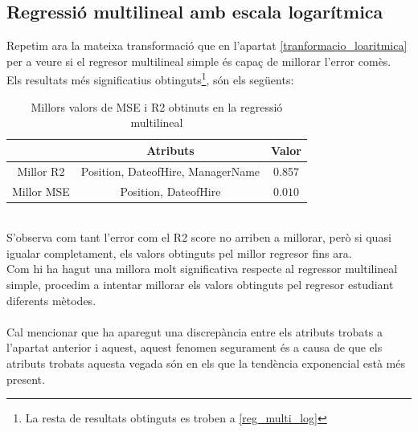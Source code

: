 \documentclass[a4paper, 11pt]{article}
\begin{document}
\subsection{Regressió multilineal amb escala logarítmica}
Repetim ara la mateixa transformació que en l'apartat \textcolor{blue}{\ref{tranformacio_loaritmica}} per a veure si el regresor multilineal simple és capaç de millorar l'error comès.\\
Els resultats més significatius obtinguts\footnote{La resta de resultats obtinguts es troben a \textcolor{blue}{\ref{reg_multi_log}}}, són els següents:
\begin{table}[h]
    \centering
    \begin{tabular}{c||c|c}
        \cellcolor{white}{} & Atributs & Valor \\ \hline \hline
        Millor R2 & Position, DateofHire, ManagerName & 0.857 \\ \hline
        Millor MSE & Position, DateofHire & $0.010$
    \end{tabular}
    \caption{Millors valors de MSE i R2 obtinuts en la regressió multilineal}
    \label{tab:my_label}
\end{table}\\
S'observa com tant l'error com el R2 score no arriben a millorar, però si quasi igualar completament, els valors obtinguts pel millor regresor fins ara.\\
Com hi ha hagut una millora molt significativa respecte al regressor multilineal simple, procedim a intentar millorar els valors obtinguts pel regresor estudiant diferents mètodes.\\\\
Cal mencionar que ha aparegut una discrepància entre els atributs trobats a l'apartat anterior i aquest, aquest fenomen segurament és a causa de que els atributs trobats aquesta vegada són en els que la tendència exponencial està més present.
\newpage
\end{document}
